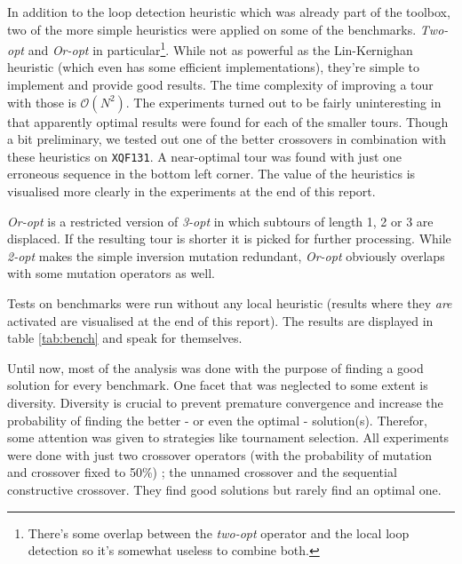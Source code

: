 
In addition to the loop detection heuristic which was already part of the toolbox, two of the more simple heuristics were applied on some of the benchmarks. \textit{Two-opt} and \textit{Or-opt} in particular\footnote{There's some overlap between the \textit{two-opt} operator and the local loop detection so it's somewhat useless to combine both.}. While not as powerful as the Lin-Kernighan heuristic (which even has some efficient implementations), they're simple to implement and provide good results. The time complexity of improving a tour with those is $\mathcal{O}(N^2)$. The experiments turned out to be fairly uninteresting in that apparently optimal results were found for each of the smaller tours. Though a bit preliminary, we tested out one of the better crossovers in combination with these heuristics on \texttt{XQF131}. A near-optimal tour was found with just one erroneous sequence in the bottom left corner. The value of the heuristics is visualised more clearly in the experiments at the end of this report.\\

\par\noindent \textit{Or-opt} is a restricted version of \textit{3-opt} in which subtours of length 1, 2 or 3 are displaced. If the resulting tour is shorter it is picked for further processing. While \textit{2-opt} makes the simple inversion mutation redundant, \textit{Or-opt} obviously overlaps with some mutation operators as well.


Tests on benchmarks were run without any local heuristic (results where they \textit{are} activated are visualised at the end of this report). The results are displayed in table \ref{tab:bench} and speak for themselves.


Until now, most of the analysis was done with the purpose of finding a good solution for every benchmark. One facet that was neglected to some extent is diversity. Diversity is crucial to prevent premature convergence and increase the probability of finding the better - or even the optimal - solution(s). Therefor, some attention was given to strategies like tournament selection. All experiments were done with just two crossover operators (with the probability of mutation and crossover fixed to 50\%) ; the unnamed crossover and the sequential constructive crossover. They find good solutions but rarely find an optimal one.

